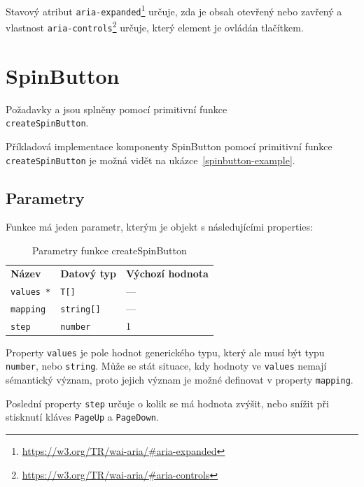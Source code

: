 Stavový atribut \texttt{aria-expanded}\footnote{\url{https://w3.org/TR/wai-aria/\#aria-expanded}} určuje, zda je obsah otevřený nebo zavřený a vlastnost \texttt{aria-controls}\footnote{\url{https://w3.org/TR/wai-aria/\#aria-controls}} určuje, který element je ovládán tlačítkem.

\clearpage

\section{SpinButton}

Požadavky \hyperref[sfr11]{} a \hyperref[sfr12]{} jsou splněny pomocí primitivní funkce\\ \texttt{createSpinButton}.

Příkladová implementace komponenty SpinButton pomocí primitivní funkce \texttt{createSpinButton} je možná vidět na ukázce~\ref{spinbutton-example}.

\subsection{Parametry}

Funkce má jeden parametr, kterým je objekt s následujícími properties:

\begin{table}[ht]\label{table:spinbutton-params}
    \begin{ctucolortab}
        \begin{tabularx}{\textwidth}{X X X}
            \bfseries Název   & \bfseries Datový typ & \bfseries Výchozí hodnota \\\Midrule{}
            \texttt{values *} & \texttt{T[]}         & ---                       \\
            \texttt{mapping}  & \texttt{string[]}    & ---                       \\
            \texttt{step}     & \texttt{number}      & 1
        \end{tabularx}
    \end{ctucolortab}
    \caption{Parametry funkce createSpinButton}
\end{table}

Property \texttt{values} je pole hodnot generického typu, který ale musí být typu \texttt{number}, nebo \texttt{string}.
Může se stát situace, kdy hodnoty ve \texttt{values} nemají sémantický význam, proto jejich význam je možné definovat v property \texttt{mapping}.

Poslední property \texttt{step} určuje o kolik se má hodnota zvýšit, nebo snížit při stisknutí kláves \texttt{PageUp} a \texttt{PageDown}.


